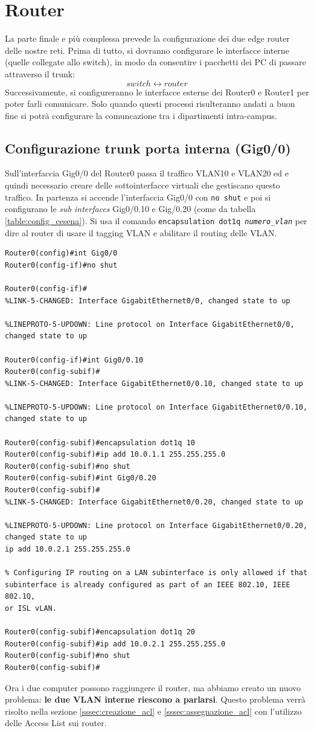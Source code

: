 \documentclass[a4paper,12pt]{report}
\begin{document}
\section{Router}
La parte finale e più complessa prevede la configurazione dei due edge router delle nostre reti.
%
Prima di tutto, si dovranno configurare le interfacce interne (quelle collegate allo switch), in modo da consentire i pacchetti dei PC di passare attraverso il trunk: $$switch \longleftrightarrow router$$
%
Successivamente, si configureranno le interfacce esterne dei Router0 e Router1 per poter farli comunicare.
%
Solo quando questi processi risulteranno andati a buon fine si potrà configurare la comuncazione tra i dipartimenti intra-campus.
\subsection{Configurazione trunk porta interna (Gig0/0)}
Sull'interfaccia Gig0/0 del Router0 passa il traffico VLAN10 e VLAN20 ed e quindi necessario creare delle sottointerfacce virtuali che gestiscano questo traffico.
%
In partenza si accende l'interfaccia Gig0/0 con \texttt{no shut} e poi si configurano le \textit{sub interfaces} Gig0/0.10 e Gig/0.20 (come da tabella \ref{table:config_cesena}).
%
Si usa il comando \texttt{encapsulation dot1q \textit{numero\_vlan}} per dire al router di usare il tagging VLAN e abilitare il routing delle VLAN.
\begin{verbatim}
Router0(config)#int Gig0/0
Router0(config-if)#no shut

Router0(config-if)#
%LINK-5-CHANGED: Interface GigabitEthernet0/0, changed state to up

%LINEPROTO-5-UPDOWN: Line protocol on Interface GigabitEthernet0/0, changed state to up

Router0(config-if)#int Gig0/0.10
Router0(config-subif)#
%LINK-5-CHANGED: Interface GigabitEthernet0/0.10, changed state to up

%LINEPROTO-5-UPDOWN: Line protocol on Interface GigabitEthernet0/0.10, changed state to up

Router0(config-subif)#encapsulation dot1q 10
Router0(config-subif)#ip add 10.0.1.1 255.255.255.0
Router0(config-subif)#no shut
Router0(config-subif)#int Gig0/0.20
Router0(config-subif)#
%LINK-5-CHANGED: Interface GigabitEthernet0/0.20, changed state to up

%LINEPROTO-5-UPDOWN: Line protocol on Interface GigabitEthernet0/0.20, changed state to up
ip add 10.0.2.1 255.255.255.0

% Configuring IP routing on a LAN subinterface is only allowed if that
subinterface is already configured as part of an IEEE 802.10, IEEE 802.1Q,
or ISL vLAN.

Router0(config-subif)#encapsulation dot1q 20
Router0(config-subif)#ip add 10.0.2.1 255.255.255.0
Router0(config-subif)#no shut
Router0(config-subif)#
\end{verbatim}
Ora i due computer possono raggiungere il router, ma abbiamo creato un nuovo problema: \textbf{le due VLAN interne riescono a parlarsi}.
%
Questo problema verrà risolto nella sezione \ref{sssec:creazione_acl} e \ref{sssec:assegnazione_acl} con l'utilizzo delle Access List sui router. 
\end{document}
